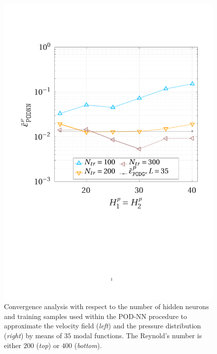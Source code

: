 \documentclass{elsarticle}
\numberwithin{equation}{section}
\theoremstyle{theorem}
\theoremstyle{definition}
\theoremstyle{remark}
\theoremstyle{proposition}
\numberwithin{figure}{section}
\begin{document}
\begin{figure}[t]
			\includegraphics[scale = 0.37, trim = {1cm 9cm 1.5cm 3.5cm}, clip]{dc_400_p_nn_convergence}
			
			\vspace*{-0.1cm}
			
			\caption{Convergence analysis with respect to the number of hidden neurons and training samples used within the POD-NN procedure to approximate the velocity field (\emph{left}) and the pressure distribution (\emph{right}) by means of $35$ modal functions. The Reynold's number is either $200$ (\emph{top}) or $400$ (\emph{bottom}).}
			\label{fig:dc-nn-convergence}
		\end{figure}
		
\end{document}

